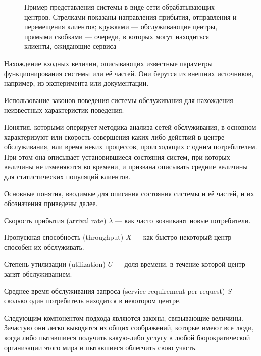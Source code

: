 \begin{enumerate*}
\begin{figure}[htb]
\begin{tikzpicture}[>=latex, node distance = 2cm, font=\small]
    \end{tikzpicture}
    \caption[Пример представления системы в виде сети обрабатывающих центров]{Пример представления системы в виде сети обрабатывающих центров. Стрелками показаны направления прибытия, отправления и перемещения клиентов; кружками --- обслуживающие центры, прямыми скобками --- очереди, в которых могут находиться клиенты, ожидающие сервиса}
    \label{fig:qsp}
\end{figure}


\item Нахождение входных величин, описывающих известные параметры функционирования системы или её частей. Они берутся из внешних источников, например, из эксперимента или документации.

\item Использование законов поведения системы обслуживания для нахождения неизвестных характеристик поведения.
\end{enumerate*}

Понятия, которыми оперирует методика анализа сетей обслуживания, в основном характеризуют или скорость совершения каких-либо действий в центре обслуживания, или время неких процессов, происходящих с одним потребителем. При этом она описывает установившиеся состояния систем, при которых величины не изменяются во времени, и призвана описывать средние величины для статистических популяций клиентов.

Основные понятия, вводимые для описания состояния системы и её частей, и их обозначения приведены далее.

\begin{itemize*}
\item 
Скорость прибытия (\abbr arrival rate) $\lambda$ --- как часто возникают новые потребители.

\item 
Пропускная способность (\abbr throughput) $X$ --- как быстро некоторый центр способен их обслуживать.

\item 
Степень утилизации (\abbr utilization) $U$ --- доля времени, в течение которой центр занят обслуживанием.

\item 
Среднее время обслуживания запроса (\abbr service requirement per request) $S$ --- сколько один потребитель находится в некотором центре.
\end{itemize*}

Следующим компонентом подхода являются законы, связывающие величины. Зачастую  они легко выводятся из общих соображений, которые имеют все люди, когда либо пытавшиеся получить какую-либо услугу в любой бюрократической организации этого мира и пытавшиеся облегчить свою участь.

